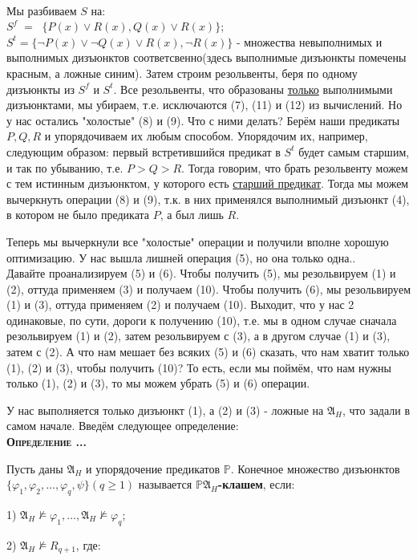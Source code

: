 \documentclass[18pt, a4paper]{extarticle}
\newcounter{par}
\newcounter{spar}
\newcounter{zap}
\newcommand{\opr}{\textbf{\textsc{Определение \thepar.\if\thespar1\thespar.\fi\thezap.\;}}\stepcounter{zap}}
\newcommand{\mA}{\mathfrak{A}}
\newcommand{\vp}{\varphi}
\newcommand{\lot}[3]{#1_#2,\dots,#1_#3}
\begin{document}
\leavevmode\\
Мы разбиваем $S$ на:\\ 
$S^f\;=\;\;\{P(x)\vee R(x),Q(x)\vee R(x)\}$;\\
$S^t=\{\lnot P(x)\vee\lnot Q(x)\vee R(x),\lnot R(x)\}$ - множества невыполнимых и выполнимых дизъюнктов соответсвенно(здесь выполнимые дизъюнкты помечены красным, а ложные синим). Затем строим резольвенты, беря по одному дизъюнкты из $S^f$ и $S^t$. Все резольвенты, что образованы \underline{только} выполнимыми дизъюнктами, мы убираем, т.е. исключаются (7), (11) и (12) из вычислений. Но у нас остались "холостые"{} (8) и (9). Что с ними делать? Берём наши предикаты $P,Q,R$ и упорядочиваем их любым способом. Упорядочим их, например, следующим образом: первый встретившийся предикат в $S^t$ будет самым старшим, и так по убыванию, т.е. $P>Q>R$. Тогда говорим, что брать резольвенту можем с тем истинным дизъюнктом, у которого есть \underline{старший предикат}. Тогда мы можем вычеркнуть операции (8) и (9), т.к. в них применялся выполнимый дизъюнкт (4), в котором не было предиката $P$, а был лишь $R$. 

Теперь мы вычеркнули все "холостые"{} операции и получили вполне хорошую оптимизацию. У нас вышла лишней операция (5), но она только одна..\\

Давайте проанализируем (5) и (6). Чтобы получить (5), мы резольвируем (1) и (2), оттуда применяем (3) и получаем (10). Чтобы получить (6), мы резольвируем (1) и (3), оттуда применяем (2) и получаем (10). Выходит, что у нас 2 одинаковые, по сути, дороги к получению (10), т.е. мы в одном случае сначала резольвируем (1) и (2), затем резольвируем с (3), а в другом случае (1) и (3), затем с (2). А что нам мешает без всяких (5) и (6) сказать, что нам хватит только (1), (2) и (3), чтобы получить (10)? То есть, если мы поймём, что нам нужны только (1), (2) и (3), то мы можем убрать (5) и (6) операции.

У нас выполняется только дизъюнкт (1), а (2) и (3) - ложные на $\mA_H$, что задали в самом начале. Введём следующее определение:\\

\opr 

Пусть даны $\mA_H$ и упорядочение предикатов $\mathbb P$. Конечное множество дизъюнктов $\{\vp_1,\lot \vp 2 q,\psi\}(q\geqslant 1)$ называется \textbf{$\mathbb P\mA_H$-клашем}, если:

1) $\mA_H\nvDash\vp_1,\dots,\mA_H\nvDash\vp_q$;

2) $\mA_H\nvDash R_{q+1}$, где:
\end{document}
